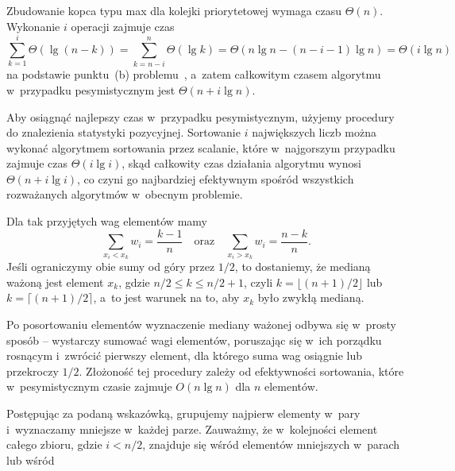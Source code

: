 \subproblem %
Zbudowanie kopca typu max dla kolejki priorytetowej wymaga czasu $\Theta(n)$. Wykonanie $i$ operacji  zajmuje czas
\[
	\sum_{k=1}^i\Theta(\lg(n-k)) = \sum_{k=n-i}^n\Theta(\lg k) = \Theta(n\lg n-(n-i-1)\lg n) = \Theta(i\lg n)
\]
na podstawie punktu~(b) problemu~, a~zatem całkowitym czasem algorytmu w~przypadku pesymistycznym jest $\Theta(n+i\lg n)$.

\subproblem %
Aby osiągnąć najlepszy czas w~przypadku pesymistycznym, użyjemy procedury  do znalezienia  statystyki pozycyjnej. Sortowanie $i$ największych liczb można wykonać algorytmem sortowania przez scalanie, które w~najgorszym przypadku zajmuje czas $\Theta(i\lg i)$, skąd całkowity czas działania algorytmu wynosi $\Theta(n+i\lg i)$, co czyni go najbardziej efektywnym spośród wszystkich rozważanych algorytmów w~obecnym problemie.


\subproblem %
Dla tak przyjętych wag elementów mamy
\[
	\sum_{x_i<x_k}w_i = \frac{k-1}{n} \quad\text{oraz}\quad \sum_{x_i>x_k}w_i = \frac{n-k}{n}.
\]
Jeśli ograniczymy obie sumy od góry przez $1/2$, to dostaniemy, że medianą ważoną jest element $x_k$, gdzie $n/2\le k\le n/2+1$, czyli $k=\lfloor(n+1)/2\rfloor$ lub $k=\lceil(n+1)/2\rceil$, a~to jest warunek na to, aby $x_k$ było zwykłą medianą.

\subproblem %
Po posortowaniu elementów wyznaczenie mediany ważonej odbywa się w~prosty sposób -- wystarczy sumować wagi elementów, poruszając się w~ich porządku rosnącym i~zwrócić pierwszy element, dla którego suma wag osiągnie lub przekroczy $1/2$. Złożoność tej procedury zależy od efektywności sortowania, które w~pesymistycznym czasie zajmuje $O(n\lg n)$ dla $n$ elementów.

\subproblem %
\subproblem %
\subproblem %


\subproblem %

\noindent Postępując za podaną wskazówką, grupujemy najpierw elementy w~pary i~wyznaczamy mniejsze w~każdej parze. Zauważmy, że  w~kolejności element całego zbioru, gdzie $i<n/2$, znajduje się wśród elementów mniejszych w~parach lub wśród 

